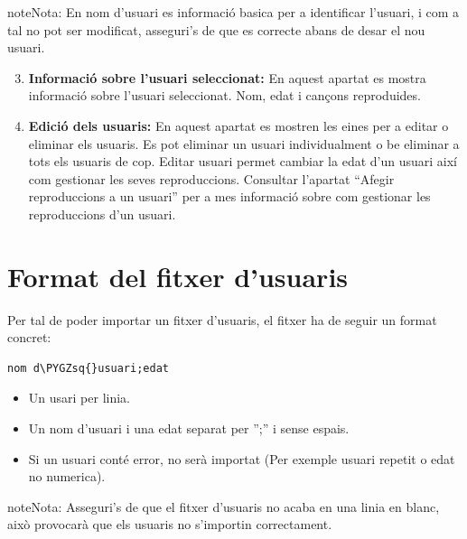 \documentclass[letterpaper,10pt,oneside]{sphinxmanual}
\def\PYGZsq{\char`\'}
\renewcommand\PYGZsq{\textquotesingle}
\begin{document}
\begin{notice}{note}{Nota:}
En nom d'usuari es informació basica per a identificar l'usuari, i com a tal no pot ser modificat, asseguri's de que es correcte abans de desar el nou usuari.
\end{notice}
\begin{enumerate}
\setcounter{enumi}{2}
\item {} 
\textbf{Informació sobre l'usuari seleccionat:} En aquest apartat es mostra informació sobre l'usuari seleccionat. Nom, edat i cançons reproduides.

\item {} 
\textbf{Edició dels usuaris:} En aquest apartat es mostren les eines per a editar o eliminar els usuaris. Es pot eliminar un usuari individualment o be eliminar a tots els usuaris de cop. Editar usuari permet cambiar la edat d'un usuari així com gestionar les seves reproduccions. Consultar l'apartat ``Afegir reproduccions a un usuari'' per a mes informació sobre com gestionar les reproduccions d'un usuari.

\end{enumerate}


\section{Format del fitxer d'usuaris}
\label{gest_usuaris:format-del-fitxer-d-usuaris}
Per tal de poder importar un fitxer d'usuaris, el fitxer ha de seguir un format concret:

\begin{Verbatim}[commandchars=\\\{\}]
nom d\PYGZsq{}usuari;edat
\end{Verbatim}
\begin{itemize}
\item {} 
Un usari per linia.

\item {} 
Un nom d'usuari i una edat separat per '';'' i sense espais.

\item {} 
Si un usuari conté error, no serà importat (Per exemple usuari repetit o edat no numerica).

\end{itemize}

\begin{notice}{note}{Nota:}
Asseguri's de que el fitxer d'usuaris no acaba en una linia en blanc, això provocarà que els usuaris no s'importin correctament.
\end{notice}
\end{document}
